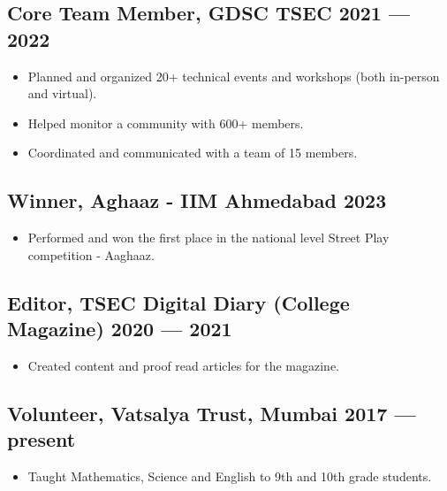 \documentclass[10pt]{article}
\newenvironment{zitemize}{
\begin{itemize}\itemsep2pt \parskip0pt \parsep1pt}
{\end{itemize}\vspace{-0.7cm}}
\begin{document}
\subsection*{Core Team Member, GDSC TSEC \hfill 2021 --- 2022} 
    \begin{zitemize}
            \item Planned and organized 20+ technical events and workshops (both in-person and virtual).
            \item Helped monitor a community with 600+ members.
            \item Coordinated and communicated with a team of 15 members.
    \end{zitemize}
    \vspace{0.1cm}

\subsection*{Winner, Aghaaz - IIM Ahmedabad \hfill 2023} 
    \begin{zitemize}
            \item Performed and won the first place in the national level Street Play competition - Aaghaaz.
            
    \end{zitemize}
    \vspace{0.1cm}

\subsection*{Editor, TSEC Digital Diary (College Magazine) \hfill 2020 --- 2021} 
    \begin{zitemize}
            \item Created content and proof read articles for the magazine.
            
    \end{zitemize}
    \vspace{0.1cm}

\subsection*{Volunteer, Vatsalya Trust, Mumbai \hfill  2017 --- present} 
    \begin{zitemize}
            \item  Taught Mathematics, Science and English to 9th and 10th grade students.
    \end{zitemize}
\end{document}
